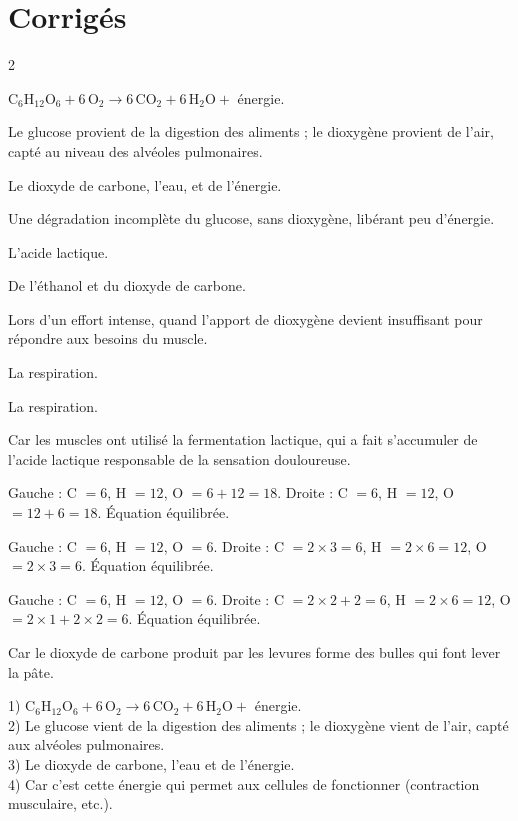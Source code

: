 \section{Corrigés}
\begin{multicols}{2}

$\mathrm{C_6H_{12}O_6+6\,O_2\to6\,CO_2+6\,H_2O+}$ énergie.

Le glucose provient de la digestion des aliments ; le dioxygène provient de l'air, capté
au niveau des alvéoles pulmonaires.

Le dioxyde de carbone, l'eau, et de l'énergie.

Une dégradation incomplète du glucose, sans dioxygène, libérant peu d'énergie.

L'acide lactique.

De l'éthanol et du dioxyde de carbone.

Lors d'un effort intense, quand l'apport de dioxygène devient insuffisant pour répondre
aux besoins du muscle.

La respiration.

La respiration.

Car les muscles ont utilisé la fermentation lactique, qui a fait s'accumuler de l'acide
lactique responsable de la sensation douloureuse.

Gauche : C $=6$, H $=12$, O $=6+12=18$. Droite : C $=6$, H $=12$, O $=12+6=18$. Équation
équilibrée.

Gauche : C $=6$, H $=12$, O $=6$. Droite : C $=2\times3=6$, H $=2\times6=12$, O
$=2\times3=6$. Équation équilibrée.

Gauche : C $=6$, H $=12$, O $=6$. Droite : C $=2\times2+2=6$, H $=2\times6=12$, O
$=2\times1+2\times2=6$. Équation équilibrée.

Car le dioxyde de carbone produit par les levures forme des bulles qui font lever la
pâte.

1) $\mathrm{C_6H_{12}O_6+6\,O_2\to6\,CO_2+6\,H_2O+}$ énergie.\\
2) Le glucose vient de la digestion des aliments ; le dioxygène vient de l'air, capté aux
alvéoles pulmonaires.\\
3) Le dioxyde de carbone, l'eau et de l'énergie.\\
4) Car c'est cette énergie qui permet aux cellules de fonctionner (contraction
musculaire, etc.).


\end{multicols}
